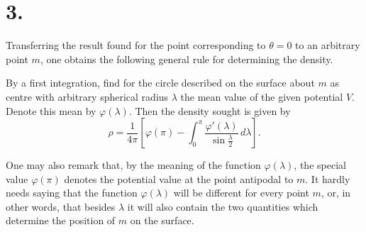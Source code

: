 \documentclass[11pt]{article}
\newcommand{\dd}{\,d}
\begin{document}
\section*{3.}

Transferring the result found for the point corresponding to $\theta=0$ to an arbitrary point $m$, one obtains the following general rule for determining the density.

By a first integration, find for the circle described on the surface about $m$ as centre with arbitrary spherical radius $\lambda$ the mean value of the given potential $V$. Denote this mean by $\varphi(\lambda)$. Then the density sought is given by
\[
 \rho=\frac1{4\pi}\left[\varphi(\pi)-\int_0^\pi\frac{\varphi'(\lambda)}{\sin\frac{\lambda}{2}}\dd\lambda\right].
\]

One may also remark that, by the meaning of the function $\varphi(\lambda)$, the special value $\varphi(\pi)$ denotes the potential value at the point antipodal to $m$. It hardly needs saying that the function $\varphi(\lambda)$ will be different for every point $m$, or, in other words, that besides $\lambda$ it will also contain the two quantities which determine the position of $m$ on the surface.
\end{document}
